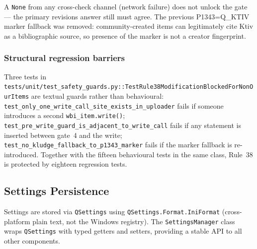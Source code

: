 \documentclass[12pt]{article}
\newcommand{\code}[1]{\texttt{#1}}
\begin{document}
A \code{None} from any cross-check channel (network failure) does not unlock the gate --- the primary revisions answer still must agree. The previous P1343=Q\_KTIV marker fallback was removed: community-created items can legitimately cite Ktiv as a bibliographic source, so presence of the marker is not a creator fingerprint.

\subsubsection*{Structural regression barriers}

Three tests in \code{tests/unit/test\_safety\_guards.py::TestRule38Modifi\-cationBlockedForNonOurItems} are textual guards rather than behavioural: \code{test\_only\_one\_write\_call\_site\_exists\_in\_uploader} fails if someone introduces a second \code{wbi\_item.write()}; \code{test\_pre\_write\_guard\_is\_adjacent\_to\_write\_call} fails if any statement is inserted between gate~4 and the write; \code{test\_no\_kludge\_fallback\_to\_p1343\_marker} fails if the marker fallback is re-introduced. Together with the fifteen behavioural tests in the same class, Rule~38 is protected by eighteen regression tests.

\subsection{Settings Persistence}

Settings are stored via \code{QSettings} using \code{QSettings.Format.IniFormat} (cross-platform plain text, not the Windows registry). The \code{SettingsManager} class wraps \code{QSettings} with typed getters and setters, providing a stable API to all other components.
\end{document}
